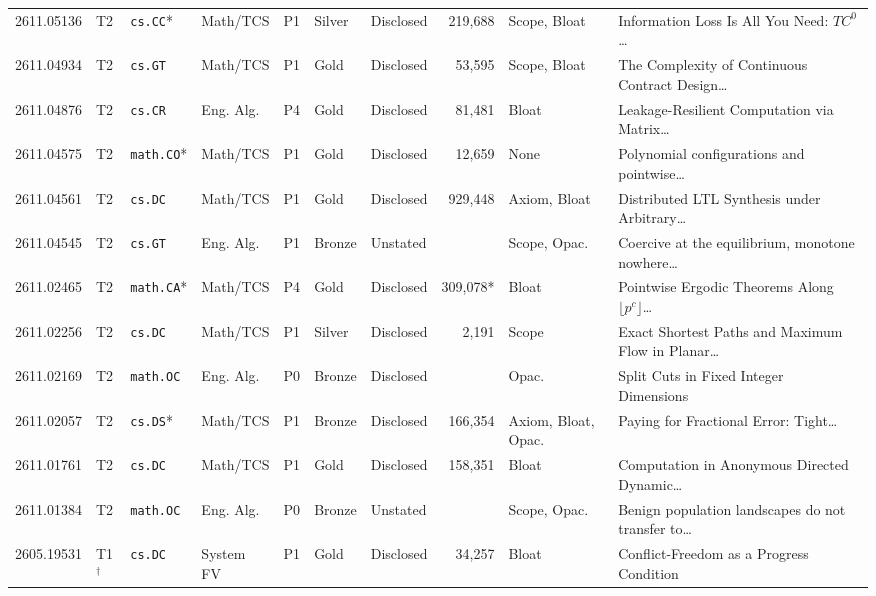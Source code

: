 \documentclass[11pt,letterpaper]{article}
\begin{document}
\begin{longtable}{lllllllrl>{\raggedright\arraybackslash}p{4.05cm}}
2611.05136 & T2 & \texttt{cs.CC}* & Math/TCS & P1 & Silver & Disclosed & 219,688 & Scope, Bloat & Information Loss Is All You Need: $TC^0$\dots~\cite{arxiv2611_05136} \\
2611.04934 & T2 & \texttt{cs.GT} & Math/TCS & P1 & Gold & Disclosed & 53,595 & Scope, Bloat & The Complexity of Continuous Contract Design\dots~\cite{arxiv2611_04934} \\
2611.04876 & T2 & \texttt{cs.CR} & Eng. Alg. & P4 & Gold & Disclosed & 81,481 & Bloat & Leakage-Resilient Computation via Matrix\dots~\cite{arxiv2611_04876} \\
2611.04575 & T2 & \texttt{math.CO}* & Math/TCS & P1 & Gold & Disclosed & 12,659 & None & Polynomial configurations and pointwise\dots~\cite{arxiv2611_04575} \\
2611.04561 & T2 & \texttt{cs.DC} & Math/TCS & P1 & Gold & Disclosed & 929,448 & Axiom, Bloat & Distributed LTL Synthesis under Arbitrary\dots~\cite{arxiv2611_04561} \\
2611.04545 & T2 & \texttt{cs.GT} & Eng. Alg. & P1 & Bronze & Unstated & \textemdash{} & Scope, Opac. & Coercive at the equilibrium, monotone nowhere\dots~\cite{arxiv2611_04545} \\
2611.02465 & T2 & \texttt{math.CA}* & Math/TCS & P4 & Gold & Disclosed & 309,078* & Bloat & Pointwise Ergodic Theorems Along $\lfloor p^c\rfloor$\dots~\cite{arxiv2611_02465} \\
2611.02256 & T2 & \texttt{cs.DC} & Math/TCS & P1 & Silver & Disclosed & 2,191 & Scope & Exact Shortest Paths and Maximum Flow in Planar\dots~\cite{arxiv2611_02256} \\
2611.02169 & T2 & \texttt{math.OC} & Eng. Alg. & P0 & Bronze & Disclosed & \textemdash{} & Opac. & Split Cuts in Fixed Integer Dimensions~\cite{arxiv2611_02169} \\
2611.02057 & T2 & \texttt{cs.DS}* & Math/TCS & P1 & Bronze & Disclosed & 166,354 & Axiom, Bloat, Opac. & Paying for Fractional Error: Tight\dots~\cite{arxiv2611_02057} \\
2611.01761 & T2 & \texttt{cs.DC} & Math/TCS & P1 & Gold & Disclosed & 158,351 & Bloat & Computation in Anonymous Directed Dynamic\dots~\cite{arxiv2611_01761} \\
2611.01384 & T2 & \texttt{math.OC} & Eng. Alg. & P0 & Bronze & Unstated & \textemdash{} & Scope, Opac. & Benign population landscapes do not transfer to\dots~\cite{arxiv2611_01384} \\
\midrule
2605.19531 & T1$^\dagger$ & \texttt{cs.DC} & System FV & P1 & Gold & Disclosed & 34,257 & Bloat & Conflict-Freedom as a Progress Condition~\cite{arxiv2605_19531} \\

\end{longtable}
\end{document}
